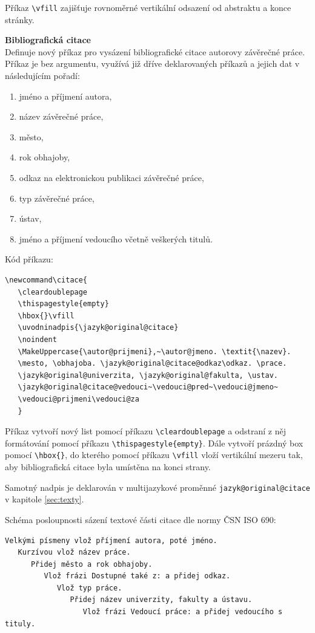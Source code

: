 Příkaz \verb|\vfill| zajišťuje rovnoměrné vertikální odsazení od abstraktu a konce stránky.

\vspace{8pt}
\textbf{Bibliografická citace}\\
Definuje nový příkaz pro vysázení bibliografické citace autorovy závěrečné práce. Příkaz je bez argumentu, využívá již dříve deklarovaných příkazů a jejich dat v následujícím pořadí:

\begin{enumerate}
	\item jméno a příjmení autora,
	\item název závěrečné práce,
	\item město,
	\item rok obhajoby,
	\item odkaz na elektronickou publikaci závěrečné práce,
	\item typ závěrečné práce,
	\item ústav,
	\item jméno a příjmení vedoucího včetně veškerých titulů.
\end{enumerate}

Kód příkazu:

\begin{verbatim}
\newcommand\citace{
   \cleardoublepage
   \thispagestyle{empty}
   \hbox{}\vfill
   \uvodninadpis{\jazyk@original@citace}
   \noindent
   \MakeUppercase{\autor@prijmeni},~\autor@jmeno. \textit{\nazev}.
   \mesto, \obhajoba. \jazyk@original@citace@odkaz\odkaz. \prace.
   \jazyk@original@univerzita, \jazyk@original@fakulta, \ustav.
   \jazyk@original@citace@vedouci~\vedouci@pred~\vedouci@jmeno~
   \vedouci@prijmeni\vedouci@za
   }
\end{verbatim}

Příkaz vytvoří nový list pomocí příkazu \verb|\cleardoublepage| a odstraní z něj formátování pomocí příkazu \verb|\thispagestyle{empty}|. Dále vytvoří prázdný box pomocí \verb|\hbox{}|, do kterého pomocí příkazu \verb|\vfill| vloží vertikální mezeru tak, aby bibliografická citace byla umístěna na konci strany.

Samotný nadpis je deklarován v multijazykové proměnné \verb|jazyk@original@citace| v kapitole \ref{sec:texty}.

Schéma posloupnosti sázení textové části citace dle normy ČSN ISO 690:

\begin{verbatim}
Velkými písmeny vlož příjmení autora, poté jméno.
   Kurzívou vlož název práce.
      Přidej město a rok obhajoby.
         Vlož frázi Dostupné také z: a přidej odkaz.
            Vlož typ práce.
               Přidej název univerzity, fakulty a ústavu.
                  Vlož frázi Vedoucí práce: a přidej vedoucího s tituly.
\end{verbatim}

